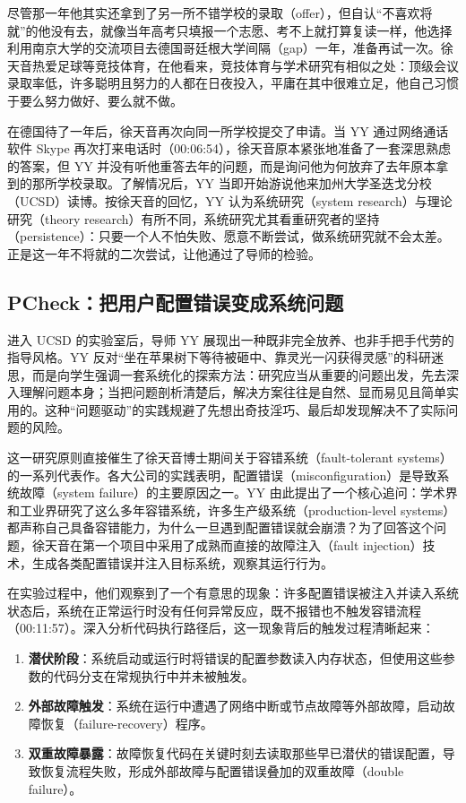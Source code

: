 \documentclass[UTF8,a4paper,11pt,fontset=fandol]{ctexart}
\begin{document}
尽管那一年他其实还拿到了另一所不错学校的录取（offer），但自认“不喜欢将就”的他没有去，就像当年高考只填报一个志愿、考不上就打算复读一样，他选择利用南京大学的交流项目去德国哥廷根大学间隔（gap）一年，准备再试一次。徐天音热爱足球等竞技体育，在他看来，竞技体育与学术研究有相似之处：顶级会议录取率低，许多聪明且努力的人都在日夜投入，平庸在其中很难立足，他自己习惯于要么努力做好、要么就不做。

在德国待了一年后，徐天音再次向同一所学校提交了申请。当 YY 通过网络通话软件 Skype 再次打来电话时（00:06:54），徐天音原本紧张地准备了一套深思熟虑的答案，但 YY 并没有听他重答去年的问题，而是询问他为何放弃了去年原本拿到的那所学校录取。了解情况后，YY 当即开始游说他来加州大学圣迭戈分校（UCSD）读博。按徐天音的回忆，YY 认为系统研究（system research）与理论研究（theory research）有所不同，系统研究尤其看重研究者的坚持（persistence）：只要一个人不怕失败、愿意不断尝试，做系统研究就不会太差。正是这一年不将就的二次尝试，让他通过了导师的检验。

\subsection{PCheck：把用户配置错误变成系统问题}
进入 UCSD 的实验室后，导师 YY 展现出一种既非完全放养、也非手把手代劳的指导风格。YY 反对“坐在苹果树下等待被砸中、靠灵光一闪获得灵感”的科研迷思，而是向学生强调一套系统化的探索方法：研究应当从重要的问题出发，先去深入理解问题本身；当把问题剖析清楚后，解决方案往往是自然、显而易见且简单实用的。这种“问题驱动”的实践规避了先想出奇技淫巧、最后却发现解决不了实际问题的风险。

这一研究原则直接催生了徐天音博士期间关于容错系统（fault-tolerant systems）的一系列代表作。各大公司的实践表明，配置错误（misconfiguration）是导致系统故障（system failure）的主要原因之一。YY 由此提出了一个核心追问：学术界和工业界研究了这么多年容错系统，许多生产级系统（production-level systems）都声称自己具备容错能力，为什么一旦遇到配置错误就会崩溃？为了回答这个问题，徐天音在第一个项目中采用了成熟而直接的故障注入（fault injection）技术，生成各类配置错误并注入目标系统，观察其运行行为。

在实验过程中，他们观察到了一个有意思的现象：许多配置错误被注入并读入系统状态后，系统在正常运行时没有任何异常反应，既不报错也不触发容错流程（00:11:57）。深入分析代码执行路径后，这一现象背后的触发过程清晰起来：
\begin{enumerate}
\item \textbf{潜伏阶段}：系统启动或运行时将错误的配置参数读入内存状态，但使用这些参数的代码分支在常规执行中并未被触发。
\item \textbf{外部故障触发}：系统在运行中遭遇了网络中断或节点故障等外部故障，启动故障恢复（failure-recovery）程序。
\item \textbf{双重故障暴露}：故障恢复代码在关键时刻去读取那些早已潜伏的错误配置，导致恢复流程失败，形成外部故障与配置错误叠加的双重故障（double failure）。
\end{enumerate}
\end{document}
